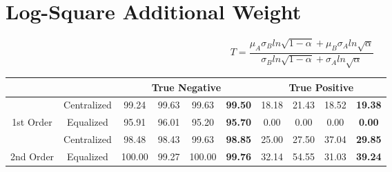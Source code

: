 \documentclass[10pt,a4paper]{article}
\begin{document}
	\section{Log-Square Additional Weight}
		$$
		T = \frac{\mu_A \sigma_B ln\sqrt{1 - \alpha}
			+ \mu_B \sigma_A ln\sqrt{\alpha}}
		{\sigma_B ln\sqrt{1 - \alpha} + \sigma_A ln\sqrt{\alpha}}
		$$
		\begin{table}[!h]
			\centering
			\begin{tabular}{|c|c|c|c|c|c|c|c|c|c|}
				\hline
				&             & \multicolumn{4}{c|}{True Negative}                              & \multicolumn{4}{c|}{True Positive}                            \\ \hline
				& Centralized & 99.24  & 99.63 & 99.63  & {\color[HTML]{FE0000} \textbf{99.50}} & 18.18 & 21.43 & 18.52 & {\color[HTML]{FE0000} \textbf{19.38}} \\ \cline{2-10} 
				\multirow{-2}{*}{1st Order} & Equalized   & 95.91  & 96.01 & 95.20  & {\color[HTML]{FE0000} \textbf{95.70}} & 0.00  & 0.00  & 0.00  & {\color[HTML]{FE0000} \textbf{0.00}}  \\ \hline
				& Centralized & 98.48  & 98.43 & 99.63  & {\color[HTML]{FE0000} \textbf{98.85}} & 25.00 & 27.50 & 37.04 & {\color[HTML]{FE0000} \textbf{29.85}} \\ \cline{2-10} 
				\multirow{-2}{*}{2nd Order} & Equalized   & 100.00 & 99.27 & 100.00 & {\color[HTML]{FE0000} \textbf{99.76}} & 32.14 & 54.55 & 31.03 & {\color[HTML]{FE0000} \textbf{39.24}} \\ \hline
			\end{tabular}
		\end{table}
		
\end{document}
